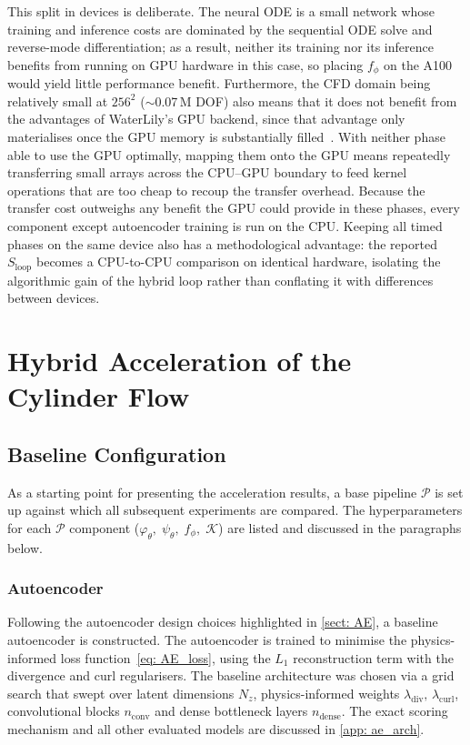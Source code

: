 This split in devices is deliberate. The neural ODE is a small network whose training and inference costs are dominated by the sequential ODE solve and reverse-mode differentiation; as a result, neither its training nor its inference benefits from running on GPU hardware in this case, so placing $f_\phi$ on the A100 would yield little performance benefit. Furthermore, the CFD domain being relatively small at $256^2$ ($\sim$0.07\,M DOF) also means that it does not benefit from the advantages of WaterLily's GPU backend, since that advantage only materialises once the GPU memory is substantially filled~\cite{Weymouth2025}. With neither phase able to use the GPU optimally, mapping them onto the GPU means repeatedly transferring small arrays across the CPU--GPU boundary to feed kernel operations that are too cheap to recoup the transfer overhead. Because the transfer cost outweighs any benefit the GPU could provide in these phases, every component except autoencoder training is run on the CPU. Keeping all timed phases on the same device also has a methodological advantage: the reported $S_\text{loop}$ becomes a CPU-to-CPU comparison on identical hardware, isolating the algorithmic gain of the hybrid loop rather than conflating it with differences between devices.


\section{Hybrid Acceleration of the Cylinder Flow}
\label{sect: 4_base_hybrid}

\subsection{Baseline Configuration}
\label{subsect: 4_baseline}
As a starting point for presenting the acceleration results, a base pipeline $\mathcal{P}$ is set up against which all subsequent experiments are compared. The hyperparameters for each $\mathcal{P}$ component ($\varphi_\theta, \; \psi_\theta, \; f_\phi, \; \mathcal{K}$) are listed and discussed in the paragraphs below.

\subsubsection{Autoencoder}
Following the autoencoder design choices highlighted in \autoref{sect: AE}, a baseline autoencoder is constructed. The autoencoder is trained to minimise the physics-informed loss function~\eqref{eq: AE_loss}, using the $L_1$ reconstruction term with the divergence and curl regularisers. The baseline architecture was chosen via a grid search that swept over latent dimensions $N_z$, physics-informed weights $\lambda_\text{div},\,\lambda_\text{curl}$, convolutional blocks $n_\text{conv}$ and dense bottleneck layers $n_\text{dense}$. The exact scoring mechanism and all other evaluated models are discussed in \autoref{app: ae_arch}. 

